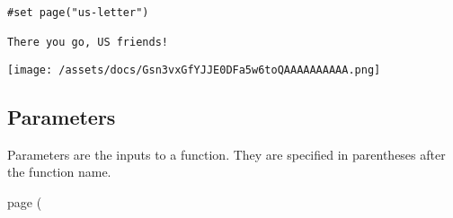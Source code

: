 \begin{verbatim}
#set page("us-letter")

There you go, US friends!
\end{verbatim}

\texttt{[image: /assets/docs/Gsn3vxGfYJJE0DFa5w6toQAAAAAAAAAA.png]}

\subsection{\texorpdfstring{{ Parameters
}}{ Parameters }}\label{parameters}

\label{parameters-tooltip}
Parameters are the inputs to a function. They are specified in
parentheses after the function name.

{ page } (

